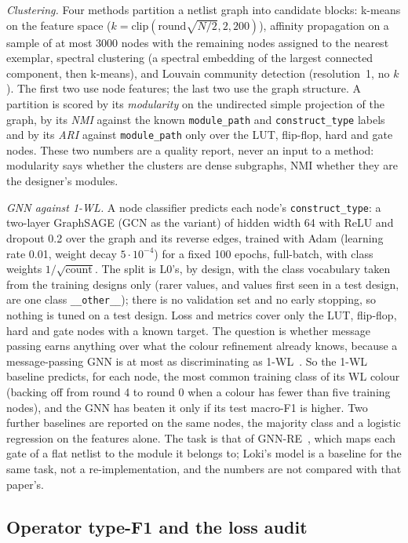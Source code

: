 \documentclass[conference]{IEEEtran}
\newcommand{\code}[1]{\texttt{#1}}
\begin{document}
\emph{Clustering.} Four methods partition a netlist graph into candidate blocks: k-means on
the feature space ($k=\mathrm{clip}(\mathrm{round}\sqrt{N/2},2,200)$), affinity propagation on
a sample of at most 3000 nodes with the remaining nodes assigned to the nearest exemplar,
spectral clustering (a spectral embedding of the largest connected component, then k-means),
and Louvain community detection (resolution~1, no $k$). The first two use node features; the
last two use the graph structure. A partition is scored by its \emph{modularity} on the
undirected simple projection of the graph, by its \emph{NMI} against the known
\code{module\_path} and \code{construct\_type} labels and by its \emph{ARI} against \code{module\_path} only over the LUT, flip-flop, hard and gate
nodes. These two numbers are a quality report, never an input to a method: modularity says
whether the clusters are dense subgraphs, NMI whether they are the designer's modules.

\emph{GNN against 1-WL.} A node classifier predicts each node's \code{construct\_type}: a
two-layer GraphSAGE (GCN as the variant) of hidden width 64 with ReLU and dropout 0.2 over the
graph and its reverse edges, trained with Adam (learning rate 0.01, weight decay $5\cdot10^{-4}$)
for a fixed 100 epochs, full-batch, with class weights $1/\sqrt{\mathrm{count}}$. The split is
L0's, by design, with the class vocabulary taken from the training designs only (rarer
values, and values first seen in a test design, are one class \code{\_\_other\_\_}); there is
no validation set and no early stopping, so nothing is tuned on a test design. Loss and metrics
cover only the LUT, flip-flop, hard and gate nodes with a known target. The question is
whether message passing earns anything over what the colour refinement already knows, because
a message-passing GNN is at most as discriminating as 1-WL~\cite{xu2019powerful}. So the 1-WL
baseline predicts, for each node, the most common training class of its WL colour (backing
off from round 4 to round 0 when a colour has fewer than five training nodes), and the
GNN has beaten it only if its test macro-F1 is higher. Two further baselines are reported on
the same nodes, the majority class and a logistic regression on the features alone. The
task is that of GNN-RE~\cite{alrahis2022gnnre}, which maps each gate of a flat netlist to the
module it belongs to; Loki's model is a baseline for the same task, not a re-implementation,
and the numbers are not compared with that paper's.

\subsection{Operator type-F1 and the loss audit}
\label{sec:newinstruments}
\end{document}
